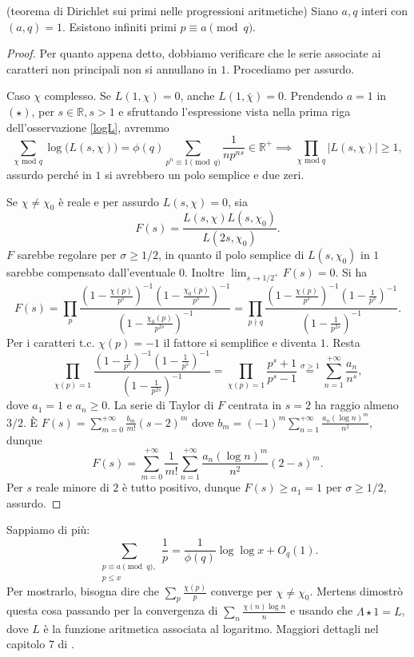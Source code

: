\begin{thm}
  (teorema di Dirichlet sui primi nelle progressioni aritmetiche) Siano $a,q$ interi con $(a,q)=1$. Esistono infiniti primi $p \equiv a \pmod{q}$.
\end{thm}

\begin{proof}
  Per quanto appena detto, dobbiamo verificare che le serie associate ai caratteri non principali non si annullano in $1$. Procediamo per assurdo.

  Caso $\chi$ complesso. Se $L(1,\chi)=0$, anche $L(1,\bar{\chi})=0$. Prendendo $a=1$ in $(\star)$, per $s \in \mathbb{R}, s>1$ e sfruttando l'espressione vista nella prima riga dell'osservazione \ref{logL}, avremmo
  $$\sum_{\chi\text{ mod }q} \log\big(L(s,\chi)\big)=\phi(q)\sum_{p^n \equiv 1 \pmod{q}} \frac{1}{np^{ns}} \in \mathbb{R}^+ \implies \prod_{\chi\text{ mod }q} |L(s,\chi)| \ge 1,$$
  assurdo perché in $1$ si avrebbero un polo semplice e due zeri.

  Se $\chi\not=\chi_0$ è reale e per assurdo $L(s,\chi)=0$, sia
  $$F(s)=\frac{L(s,\chi)L(s,\chi_0)}{L(2s,\chi_0)}.$$
  $F$ sarebbe regolare per $\sigma \ge 1/2$, in quanto il polo semplice di $L(s,\chi_0)$ in $1$ sarebbe compensato dall'eventuale $0$. Inoltre $\displaystyle \lim_{s \longrightarrow 1/2^+} F(s)=0$. Si ha
  $$F(s)=\prod_p \frac{\left(1-\frac{\chi(p)}{p^s}\right)^{-1}\left(1-\frac{\chi_0(p)}{p^s}\right)^{-1}}{\left(1-\frac{\chi_0(p)}{p^{2s}}\right)^{-1}}=\prod_{p\nmid q} \frac{\left(1-\frac{\chi(p)}{p^s}\right)^{-1}\left(1-\frac{1}{p^s}\right)^{-1}}{\left(1-\frac{1}{p^{2s}}\right)^{-1}}.$$
  Per i caratteri t.c. $\chi(p)=-1$ il fattore si semplifice e diventa $1$. Resta
  $$\prod_{\chi(p)=1} \frac{\left(1-\frac{1}{p^s}\right)^{-1}\left(1-\frac{1}{p^s}\right)^{-1}}{\left(1-\frac{1}{p^{2s}}\right)^{-1}}=\prod_{\chi(p)=1} \frac{p^s+1}{p^s-1}\overset{\sigma>1}{=} \sum_{n=1}^{+\infty} \frac{a_n}{n^s},$$
  dove $a_1=1$ e $a_n \ge 0$. La serie di Taylor di $F$ centrata in $s=2$ ha raggio almeno $3/2$. È $\displaystyle F(s)=\sum_{m=0}^{+\infty} \frac{b_m}{m!}(s-2)^m$ dove $\displaystyle b_m=(-1)^m\sum_{n=1}^{+\infty} \frac{a_n(\log{n})^m}{n^2}$, dunque
  $$F(s)=\sum_{m=0}^{+\infty} \frac{1}{m!} \sum_{n=1}^{+\infty} \frac{a_n(\log{n})^m}{n^2}(2-s)^m.$$
  Per $s$ reale minore di $2$ è tutto positivo, dunque $F(s) \ge a_1=1$ per $\sigma \ge 1/2$, assurdo.
\end{proof}

Sappiamo di più:
$$\sum_{\substack{p\equiv a\pmod{q}, \\ p \le x}} \frac{1}{p}=\frac{1}{\phi(q)}\log\log{x}+O_q(1).$$
Per mostrarlo, bisogna dire che $\displaystyle \sum_p \frac{\chi(p)}{p}$ converge per $\chi\not=\chi_0$. Mertens dimostrò questa cosa passando per la convergenza di $\displaystyle \sum_n \frac{\chi(n)\log{n}}{n}$ e usando che $\Lambda \star 1=L$, dove $L$ è la funzione aritmetica associata al logaritmo. Maggiori dettagli nel capitolo 7 di \cite{D}.
